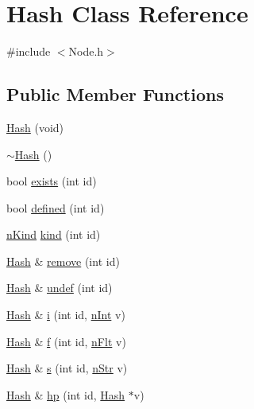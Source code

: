 \hypertarget{classHash}{}\section{Hash Class Reference}
\label{classHash}


{\ttfamily \#include $<$Node.\+h$>$}

\subsection*{Public Member Functions}
\begin{DoxyCompactItemize}
\item 
\mbox{\hyperlink{classHash_a73664aa35c78765aff5ef005db70d245}{Hash}} (void)
\item 
\mbox{\hyperlink{classHash_a4e4b4797dda8678aaed058bae155813e}{$\sim$\+Hash}} ()
\item 
bool \mbox{\hyperlink{classHash_af7a8ac0f6edd46bf065f70e077ca4b48}{exists}} (int id)
\item 
bool \mbox{\hyperlink{classHash_a90db160a10f8005570e89b3eba1fe26b}{defined}} (int id)
\item 
\mbox{\hyperlink{Node_8h_a0ec4934d366e0d191f86c6ca9c1a922f}{n\+Kind}} \mbox{\hyperlink{classHash_a2bda97917ff3acb69ff3cc18616e13f0}{kind}} (int id)
\item 
\mbox{\hyperlink{classHash}{Hash}} \& \mbox{\hyperlink{classHash_a71dbf5e1dc44f10935179edd0f43a8f6}{remove}} (int id)
\item 
\mbox{\hyperlink{classHash}{Hash}} \& \mbox{\hyperlink{classHash_ab012231e2ae6d2cac49dfd817a247a96}{undef}} (int id)
\item 
\mbox{\hyperlink{classHash}{Hash}} \& \mbox{\hyperlink{classHash_a57bf0acaae601c62c08bbe86442045ef}{i}} (int id, \mbox{\hyperlink{Node_8h_a17693eab3c96e5b590641f884a5a6ff1}{n\+Int}} v)
\item 
\mbox{\hyperlink{classHash}{Hash}} \& \mbox{\hyperlink{classHash_a47cc69e325e104ffbdf8b371484b77f5}{f}} (int id, \mbox{\hyperlink{Node_8h_aa7fdace1cf021510d341a4ce92e2223a}{n\+Flt}} v)
\item 
\mbox{\hyperlink{classHash}{Hash}} \& \mbox{\hyperlink{classHash_a3a556ff261a5f28ba38fd404cb8335b9}{s}} (int id, \mbox{\hyperlink{Node_8h_a0d7591b97fcccd83c3c2ce469c8bc25c}{n\+Str}} v)
\item 
\mbox{\hyperlink{classHash}{Hash}} \& \mbox{\hyperlink{classHash_ae846c2193a26ac79cad5113357521132}{hp}} (int id, \mbox{\hyperlink{classHash}{Hash}} $\ast$v)
\item 

\end{DoxyCompactItemize}
